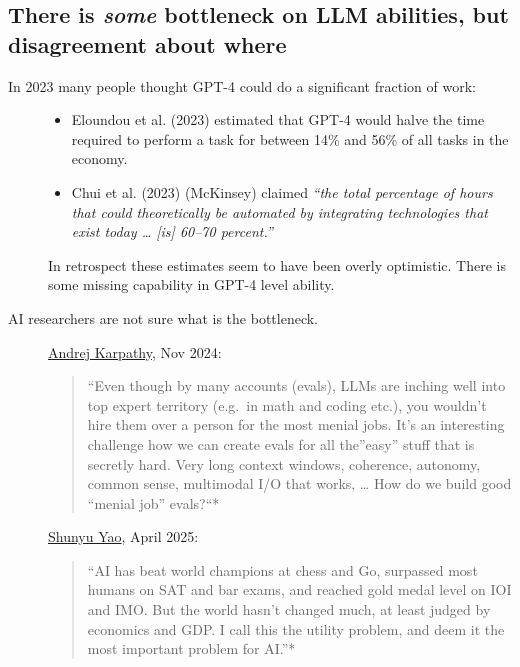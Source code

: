 \documentclass[
  letterpaper,
  DIV=11,
  numbers=noendperiod,
  oneside]{scrartcl}
\begin{document}
\subsection{\texorpdfstring{There is \emph{some} bottleneck on LLM
abilities, but disagreement about
where}{There is some bottleneck on LLM abilities, but disagreement about where}}\label{there-is-some-bottleneck-on-llm-abilities-but-disagreement-about-where}

\begin{description}
\item[In 2023 many people thought GPT-4 could do a significant fraction
of work:]
\hfill
\begin{itemize}
\item
  Eloundou et al. (2023) estimated that GPT-4 would halve the time
  required to perform a task for between 14\% and 56\% of all tasks in
  the economy.
\item
  Chui et al. (2023) (McKinsey) claimed \emph{``the total percentage of
  hours that could theoretically be automated by integrating
  technologies that exist today \ldots{} {[}is{]} 60--70 percent.''}
\end{itemize}

In retrospect these estimates seem to have been overly optimistic. There
is some missing capability in GPT-4 level ability.
\item[AI researchers are not sure what is the bottleneck.]
\href{https://x.com/karpathy/status/1855659091877937385}{Andrej
Karpathy}, Nov 2024:

\begin{quote}
``Even though by many accounts (evals), LLMs are inching well into top
expert territory (e.g.~in math and coding etc.), you wouldn't hire them
over a person for the most menial jobs. It's an interesting challenge
how we can create evals for all the''easy'' stuff that is secretly hard.
Very long context windows, coherence, autonomy, common sense, multimodal
I/O that works, \ldots{} How do we build good ``menial job'' evals?{}``*
\end{quote}

\href{https://ysymyth.github.io/The-Second-Half/}{Shunyu Yao}, April
2025:

\begin{quote}
``AI has beat world champions at chess and Go, surpassed most humans on
SAT and bar exams, and reached gold medal level on IOI and IMO. But the
world hasn't changed much, at least judged by economics and GDP. I call
this the utility problem, and deem it the most important problem for
AI.''*
\end{quote}
\end{description}
\end{document}
